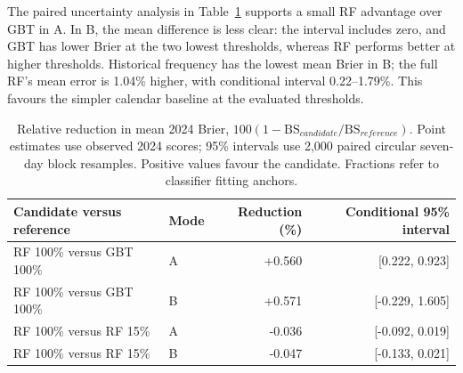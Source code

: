 \documentclass[11pt,a4paper]{article}
\begin{document}
The paired uncertainty analysis in Table~\ref{tab:pairedmodels} supports a small RF advantage over GBT in A. In B, the mean difference is less clear: the interval includes zero, and GBT has lower Brier at the two lowest thresholds, whereas RF performs better at higher thresholds. Historical frequency has the lowest mean Brier in B; the full RF's mean error is 1.04\% higher, with conditional interval 0.22--1.79\%. This favours the simpler calendar baseline at the evaluated thresholds.

\begin{table}[htbp]\centering\small
\begin{tabular}{llrr}\toprule
Candidate versus reference & Mode & Reduction (\%) & Conditional 95\% interval\\\midrule
RF 100\% versus GBT 100\% & A & +0.560 & [0.222, 0.923] \\
RF 100\% versus GBT 100\% & B & +0.571 & [-0.229, 1.605] \\
RF 100\% versus RF 15\% & A & -0.036 & [-0.092, 0.019] \\
RF 100\% versus RF 15\% & B & -0.047 & [-0.133, 0.021] \\
\bottomrule\end{tabular}
\caption{Relative reduction in mean 2024 Brier, $100(1-\mathrm{BS}_{candidate}/\mathrm{BS}_{reference})$. Point estimates use observed 2024 scores; 95\% intervals use 2,000 paired circular seven-day block resamples. Positive values favour the candidate. Fractions refer to classifier fitting anchors.}\label{tab:pairedmodels}
\end{table}

\FloatBarrier
\end{document}
